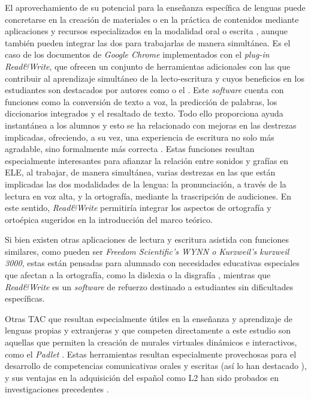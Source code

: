 \documentclass[spanish]{textolivre}
\begin{document}
El aprovechamiento de su potencial para la enseñanza específica de lenguas puede concretarse en la creación de materiales o en la práctica de contenidos mediante aplicaciones y recursos especializados en la modalidad oral o escrita \cite{vazquez-cano_nuevas_2014,estevez_rionegro_tecnologias_2024}, aunque también pueden integrar las dos para trabajarlas de manera simultánea. Es el caso de los documentos de \textit{Google Chrome} implementados con el \textit{plug-in Read\&Write}, que ofrecen un conjunto de herramientas adicionales con las que contribuir al aprendizaje simultáneo de la lecto-escritura y cuyos beneficios en los estudiantes son destacados por autores como \textcite{liou_training_2009,pim_emerging_2013} o el \textcite{departamento_de_educacion_de_la_comunidad_autonoma_del_pais_vasco_propuestas_2020}. Este \textit{software} cuenta con funciones como la conversión de texto a voz, la predicción de palabras, los diccionarios integrados y el resaltado de texto. Todo ello proporciona ayuda instantánea a los alumnos y esto se ha relacionado con mejoras en las destrezas implicadas, ofreciendo, a su vez, una experiencia de escritura no solo más agradable, sino formalmente más correcta \cite{orr_assisted_2007,ok_digital_2019}. Estas funciones resultan especialmente interesantes para afianzar la relación entre sonidos y grafías en ELE, al trabajar, de manera simultánea, varias destrezas en las que están implicadas las dos modalidades de la lengua: la pronunciación, a través de la lectura en voz alta, y la ortografía, mediante la trascripción de audiciones. En este sentido, \textit{Read\&Write} permitiría integrar los aspectos de ortografía y ortoépica sugeridos en la introducción del marco teórico.

Si bien existen otras aplicaciones de lectura y escritura asistida con funciones similares, como pueden ser \textit{Freedom Scientific’s WYNN o Kurzweil’s kurzweil 3000}, estas están pensadas para alumnado con necesidades educativas especiales que afectan a la ortografía, como la dislexia o la disgrafía \cite{orr_assisted_2007}, mientras que \textit{Read\&Write} es un \textit{software} de refuerzo destinado a estudiantes sin dificultades específicas.

Otras TAC que resultan especialmente útiles en la enseñanza y aprendizaje de lenguas propias y extranjeras y que competen directamente a este estudio son aquellas que permiten la creación de murales virtuales dinámicos e interactivos, como el \textit{Padlet} \cite{servio_padlet:_2022,conceicao_as_2022}. Estas herramientas resultan especialmente provechosas para el desarrollo de competencias comunicativas orales y escritas (así lo han destacado \textcite{vazquez-cano_nuevas_2014,estevez_rionegro_tecnologias_2024}), y sus ventajas en la adquisición del español como L2 han sido probados en investigaciones precedentes \cite{stinga_fortaleciendo_2021,gonzalez_enfoque_2023}.
\end{document}
